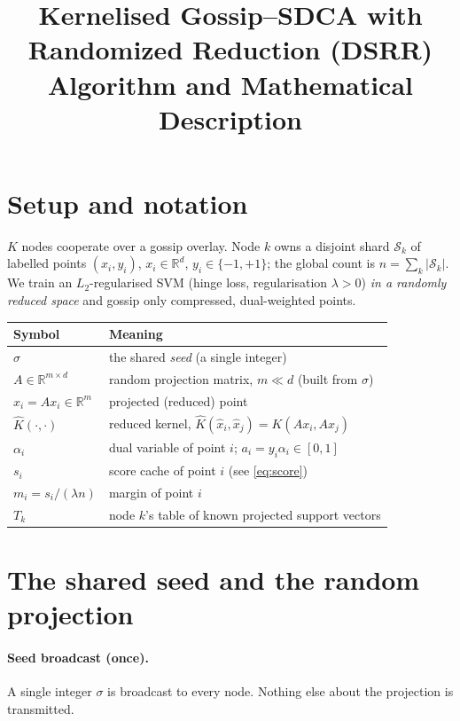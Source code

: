 \documentclass[11pt]{article}
\title{Kernelised Gossip--SDCA with Randomized Reduction (DSRR)\\
\large Algorithm and Mathematical Description}
\author{}
\date{}
\newcommand{\R}{\mathbb{R}}
\begin{document}
\maketitle

\section{Setup and notation}

$K$ nodes cooperate over a gossip overlay. Node $k$ owns a disjoint shard
$\mathcal{S}_k$ of labelled points $(x_i,y_i)$, $x_i\in\R^{d}$, $y_i\in\{-1,+1\}$;
the global count is $n=\sum_k|\mathcal{S}_k|$. We train an $L_2$-regularised SVM
(hinge loss, regularisation $\lambda>0$) \emph{in a randomly reduced space} and
gossip only compressed, dual-weighted points.

\begin{center}
\begin{tabular}{ll}
\toprule
Symbol & Meaning \\
\midrule
$\sigma$                 & the shared \emph{seed} (a single integer) \\
$A\in\R^{m\times d}$     & random projection matrix, $m\ll d$ (built from $\sigma$) \\
$\hat x_i = A x_i\in\R^{m}$ & projected (reduced) point \\
$\hat K(\cdot,\cdot)$    & reduced kernel, $\hat K(\hat x_i,\hat x_j)=K(Ax_i,Ax_j)$ \\
$\alpha_i$               & dual variable of point $i$; $a_i=y_i\alpha_i\in[0,1]$ \\
$s_i$                    & score cache of point $i$ (see \eqref{eq:score}) \\
$m_i=s_i/(\lambda n)$    & margin of point $i$ \\
$T_k$                    & node $k$'s table of known projected support vectors \\
\bottomrule
\end{tabular}
\end{center}

\section{The shared seed and the random projection}

\paragraph{Seed broadcast (once).} A single integer $\sigma$ is broadcast to every
node. Nothing else about the projection is transmitted.
\end{document}
